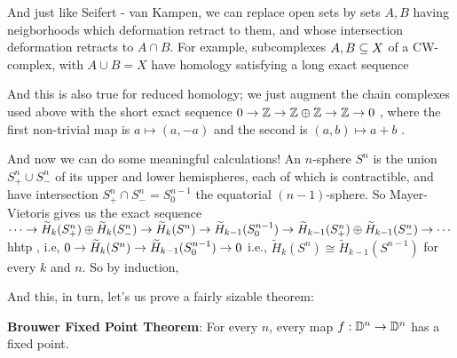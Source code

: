 
\msk

And just like Seifert - van Kampen, we can replace open sets by sets $A,B$ having neigborhoods which deformation
retract to them, and whose intersection deformation retracts to $A\cap B$. For example,
subcomplexes $A,B\subseteq X$ of a CW-complex, with $A\cup B = X$ have homology satisfying a long
exact sequence

\ssk


\ssk

And this is also true for reduced homology; we just augment the chain complexes used above with the 
short exact sequence \hhsk $0\rightarrow {\Bbb Z}\rightarrow {\Bbb Z}\oplus {\Bbb Z} \rightarrow {\Bbb Z} \rightarrow 0$ , 
where the first non-trivial map is $a\mapsto (a,-a)$ and the second is $(a,b)\mapsto a+b$ .

\msk

And now we can do some meaningful calculations!  An $n$-sphere $S^n$
is the union $S^n_+\cup S^n_-$ of its upper and lower hemispheres, each of which 
is contractible, and have intersection $S^n_+\cap S^n_-=S^{n-1}_0$ the equatorial
$(n-1)$-sphere. So Mayer-Vietoris gives us the exact sequence
\hhsk $\cdots \rightarrow \widetilde{H}_k(S^n_+)\oplus \widetilde{H}_k(S^n_-) \rightarrow \widetilde{H}_k(S^n)
\rightarrow \widetilde{H}_{k-1}(S^{n-1}_0) \rightarrow \widetilde{H}_{k-1}(S^n_+)\oplus \widetilde{H}_{k-1}(S^n_-)\rightarrow \cdots$ 
hhtp , i.e, \hhsk
$0 \rightarrow \widetilde{H}_k(S^n)\rightarrow \widetilde{H}_{k-1}(S^{n-1}_0) \rightarrow  0$ \hhsk 
i.e., $\widetilde{H}_k(S^n)\cong \widetilde{H}_{k-1}(S^{n-1})$ for every $k$ and $n$. 
So by induction, 

\ssk


\msk

And this, in turn, let's us prove a fairly sizable theorem:

\ssk

{\bf Brouwer Fixed Point Theorem}: For every $n$, every
map $f:{\Bbb D}^n\rightarrow {\Bbb D}^n$ has a fixed point.

